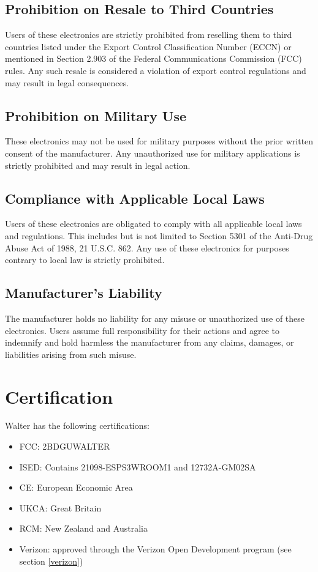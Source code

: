 \documentclass[11pt]{article}
\begin{document}
\subsection{Prohibition on Resale to Third Countries}
Users of these electronics are strictly prohibited from reselling them to third countries listed under the Export Control Classification Number (ECCN) or mentioned in Section 2.903 of the Federal Communications Commission (FCC) rules. Any such resale is considered a violation of export control regulations and may result in legal consequences.

\subsection{Prohibition on Military Use}
These electronics may not be used for military purposes without the prior written consent of the manufacturer. Any unauthorized use for military applications is strictly prohibited and may result in legal action.

\subsection{Compliance with Applicable Local Laws}
Users of these electronics are obligated to comply with all applicable local laws and regulations. This includes but is not limited to Section 5301 of the Anti-Drug Abuse Act of 1988, 21 U.S.C. 862. Any use of these electronics for purposes contrary to local law is strictly prohibited.

\subsection{Manufacturer's Liability}
The manufacturer holds no liability for any misuse or unauthorized use of these electronics. Users assume full responsibility for their actions and agree to indemnify and hold harmless the manufacturer from any claims, damages, or liabilities arising from such misuse.

\section{Certification}
Walter has the following certifications:
\begin{itemize}
	\item FCC: 2BDGUWALTER
	\item ISED: Contains 21098-ESPS3WROOM1 and 12732A-GM02SA
	\item CE: European Economic Area
	\item UKCA: Great Britain
	\item RCM: New Zealand and Australia
	\item Verizon: approved through the Verizon Open Development program (see section \ref{verizon})
\end{itemize}
\end{document}
